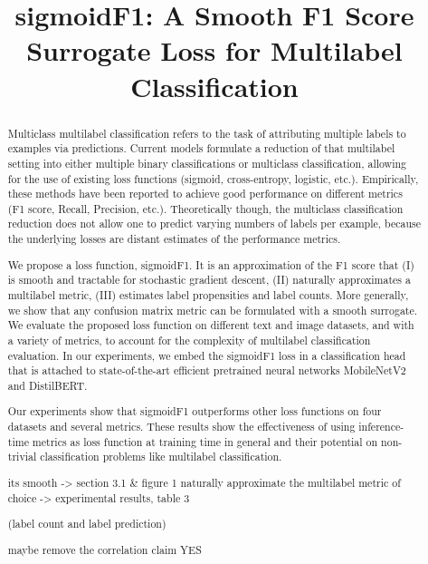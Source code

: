 \documentclass[sigconf,natbib,screen=true,review=true,anonymous]{acmart}
\begin{document}
\title[sigmoidF1: A Smooth F1 Score Surrogate Loss for Multilabel Classification]{sigmoidF1: A Smooth F1 Score Surrogate Loss for Multilabel Classification}

\begin{abstract}

  Multiclass multilabel classification refers to the task of attributing multiple labels to examples via predictions. Current models formulate a reduction of that multilabel setting into either multiple binary classifications or multiclass classification, allowing for the use of existing loss functions (sigmoid, cross-entropy, logistic, etc.). Empirically, these methods have been reported to achieve good performance on different metrics (F1 score, Recall, Precision, etc.). Theoretically though, the multiclass classification reduction does not allow one to predict varying numbers of labels per example, because the underlying losses are distant estimates of the performance metrics.

  We propose a loss function, sigmoidF1. It is an approximation of the F1 score that (I) is smooth and tractable for stochastic gradient descent, (II) naturally approximates a multilabel metric, (III) estimates label propensities and label counts. More generally, we show that any confusion matrix metric can be formulated with a smooth surrogate. We evaluate the proposed loss function on different text and image datasets, and with a variety of metrics, to account for the complexity of multilabel classification evaluation. In our experiments, we embed the sigmoidF1 loss in a classification head that is attached to state-of-the-art efficient pretrained neural networks MobileNetV2 and DistilBERT.

Our experiments show that sigmoidF1 outperforms other loss functions on four datasets and several metrics. These results show the effectiveness of using inference-time metrics as loss function at training time in general and their potential on non-trivial classification problems like multilabel classification.

its smooth -> section 3.1 & figure 1
naturally approximate the multilabel metric of choice -> experimental results, table 3

(label count and label prediction)

maybe remove the correlation claim YES


\end{abstract}
\end{document}
